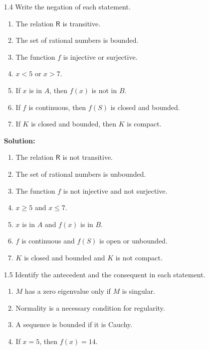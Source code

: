 \begin{enumerate}
   \item[1.4] Write the negation of each statement.
      \begin{enumerate}
         \item The relation $\mathsf{R}$ is transitive.
         \item The set of rational numbers is bounded.
         \item The function $f$ is injective or surjective.
         \item $x < 5$ or $x > 7$.
         \item If $x$ is in $A$, then $f(x)$ is not in $B$.
         \item If $f$ is continuous, then $f(S)$ is closed and bounded.
         \item If $K$ is closed and bounded, then $K$ is compact.
      \end{enumerate}

      \textbf{Solution:}

      \begin{enumerate}
         \item The relation $\mathsf{R}$ is not transitive.
         \item The set of rational numbers is unbounded.
         \item The function $f$ is not injective and not surjective.
         \item $x \ge 5$ and $x \le 7$.
         \item $x$ is in $A$ and $f(x)$ is in $B$.
         \item $f$ is continuous and $f(S)$ is open or unbounded.
         \item $K$ is closed and bounded and $K$ is not compact.
      \end{enumerate}

   \item[1.5] Identify the antecedent and the consequent in each statement.
      \begin{enumerate}
         \item $M$ has a zero eigenvalue only if $M$ is singular.
         \item Normality is a necessary condition for regularity.
         \item A sequence is bounded if it is Cauchy.
         \item If $x = 5$, then $f(x) = 14$.
      \end{enumerate}


\end{enumerate}
